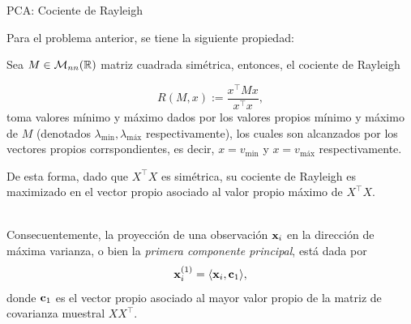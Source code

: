 \documentclass[9pt, handout]{beamer}
\begin{document}
\begin{frame}{PCA: Cociente de Rayleigh}
	
Para el problema anterior, se tiene la siguiente propiedad:

\begin{lemma}

Sea $M\in\mathcal{M}_{nn}(\mathbb{R})$ matriz cuadrada simétrica, entonces, el cociente de Rayleigh

\begin{equation*}
	R(M,x):=\frac{x^\top Mx}{x^\top x},
\end{equation*}
toma valores mínimo y máximo dados por los valores propios mínimo y máximo de $M$ (denotados $\lambda_{\text{min}},\lambda_{\text{máx}}$ respectivamente), los cuales son alcanzados por los vectores propios corrspondientes, es decir,  $x=v_{\text{min}}$ y $ x=v_{\text{máx}}$ respectivamente.

\end{lemma}
\pause
De esta forma, dado que $X^\top X$ es simétrica, su cociente de Rayleigh es maximizado en el vector propio asociado al valor propio máximo de $X^\top X$.\\~\ \pause

Consecuentemente, la proyección de una observación $\mathbf{x}_i$ en la dirección de máxima varianza, o bien la \emph{primera componente principal}, está dada por 
\begin{equation*}
	\mathbf{x}_i^{(1)} = \langle \mathbf{x}_i, \mathbf{c}_1 \rangle,
\end{equation*}
donde $\mathbf{c}_1$ es el vector propio asociado al mayor valor propio de la matriz de covarianza muestral $XX^\top$.\\	
\end{frame}
\end{document}
